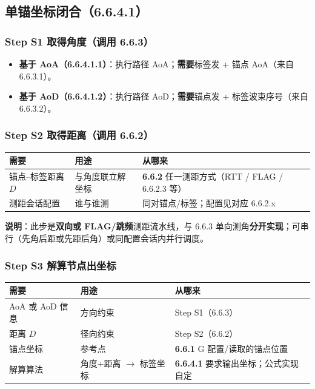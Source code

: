 \documentclass[11pt,a4paper]{ctexart}
\begin{document}
\subsection{单锚坐标闭合（6.6.4.1）}
\label{sec:single}

\subsubsection{Step S1 取得角度（调用 6.6.3）}

\begin{itemize}[nosep]
  \item \textbf{基于 AoA（6.6.4.1.1）}：执行路径 AoA；\textbf{需要}标签发 + 锚点 AoA（来自 6.6.3.1）。
  \item \textbf{基于 AoD（6.6.4.1.2）}：执行路径 AoD；\textbf{需要}锚点发 + 标签波束序号（来自 6.6.3.2）。
\end{itemize}

\subsubsection{Step S2 取得距离（调用 6.6.2）}

\begin{table}[h]
\centering
\small
\begin{tabular}{L{3.2cm}L{5.0cm}L{4.8cm}}
\toprule
\textbf{需要} & \textbf{用途} & \textbf{从哪来} \\
\midrule
锚点--标签距离 $D$ & 与角度联立解坐标 & \textbf{6.6.2} 任一测距方式（RTT / FLAG / 6.6.2.3 等） \\
测距会话配置 & 谁与谁测 & 同对锚点/标签；配置见对应 6.6.2.x \\
\bottomrule
\end{tabular}
\end{table}

\textbf{说明}：此步是\textbf{双向或 FLAG/跳频}测距流水线，与 6.6.3 单向测角\textbf{分开实现}；可串行（先角后距或先距后角）或同配置会话内并行调度。

\subsubsection{Step S3 解算节点出坐标}

\begin{table}[h]
\centering
\small
\begin{tabular}{L{3.2cm}L{5.0cm}L{4.8cm}}
\toprule
\textbf{需要} & \textbf{用途} & \textbf{从哪来} \\
\midrule
AoA 或 AoD 信息 & 方向约束 & Step S1（6.6.3） \\
距离 $D$ & 径向约束 & Step S2（6.6.2） \\
锚点坐标 & 参考点 & \textbf{6.6.1} G 配置/读取的锚点位置 \\
解算算法 & 角度+距离 $\rightarrow$ 标签坐标 & \textbf{6.6.4.1} 要求输出坐标；公式实现自定 \\
\bottomrule
\end{tabular}
\end{table}
\end{document}
